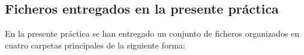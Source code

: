 \documentclass[10pt, spanish]{article}
\begin{document}






\begin{appendices}
\section{Ficheros entregados en la presente práctica}
\label{app:ficheros}

En la presente práctica se han entregado un conjunto de ficheros organizados en cuatro carpetas principales de la siguiente forma:


\end{appendices}
\end{document}
